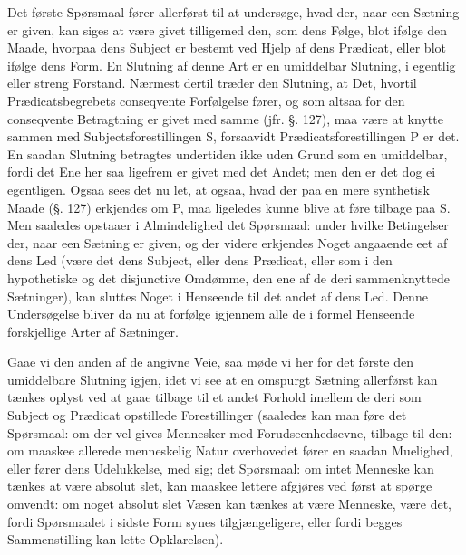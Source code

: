 \documentclass[12pt]{book}
\def\textit#1{#1}%
\def\emph#1{#1}%
\newcommand{\opage}[1]{\marginnote{\footnotesize\textit{[#1]}}}
\begin{document}
Det første Spørsmaal fører allerførst til at undersøge, hvad der, naar een Sætning er
given, kan siges at være givet tilligemed den, som dens Følge, blot ifølge den Maade,
hvorpaa dens Subject er bestemt ved Hjelp af dens Prædicat, eller blot ifølge dens
Form. En Slutning af denne Art er en \emph{umiddelbar} Slutning, \emph{i egentlig
eller streng Forstand}. Nærmest dertil
\opage{327} træder den Slutning, at Det, hvortil Prædicatsbegrebets conseqvente Forfølgelse fører,
og som altsaa for den conseqvente Betragtning er givet med samme (jfr. §. 127), maa
være at knytte sammen med Subjectsforestillingen \textit{S}, forsaavidt
Prædicatsforestillingen \textit{P} er det. En saadan Slutning betragtes undertiden ikke
uden Grund som en \emph{umiddelbar}, fordi det Ene her saa ligefrem er givet med det
Andet; men den er det dog ei egentligen. Ogsaa sees det nu let, at ogsaa, hvad der paa
en mere synthetisk Maade (§. 127) erkjendes om \textit{P}, maa ligeledes kunne blive at
føre tilbage paa \textit{S}. Men saaledes opstaaer i Almindelighed det Spørsmaal: under
hvilke Betingelser der, naar een Sætning er given, og der videre erkjendes Noget
angaaende eet af dens Led (være det dens Subject, eller dens Prædicat, eller som i den
hypothetiske og det disjunctive Omdømme, den ene af de deri sammenknyttede Sætninger),
kan sluttes Noget i Henseende til det andet af dens Led. Denne Undersøgelse bliver da
nu at forfølge igjennem alle de i formel Henseende forskjellige Arter af Sætninger.

Gaae vi den anden af de angivne Veie, saa møde vi her for det første den
\emph{umiddelbare} Slutning igjen, idet vi see at en omspurgt Sætning allerførst kan
tænkes oplyst ved at gaae tilbage til et andet Forhold imellem de deri som Subject og
Prædicat opstillede Forestillinger (saaledes kan man føre det Spørsmaal: om der vel
\opage{328} gives Mennesker med Forudseenhedsevne, tilbage til den: om
maaskee allerede menneskelig Natur overhovedet fører en saadan
Muelighed, eller fører dens Udelukkelse, med sig; det Spørsmaal:
om intet Menneske kan tænkes at være absolut slet, kan maaskee
lettere afgjøres ved først at spørge omvendt: om noget absolut
slet Væsen kan tænkes at være Menneske, være det, fordi
Spørsmaalet i sidste Form synes tilgjængeligere, eller fordi
begges Sammenstilling kan lette Opklarelsen).
\end{document}
